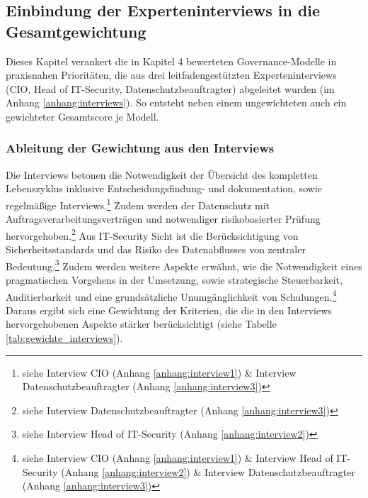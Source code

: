 \subsection{Einbindung der Experteninterviews in die Gesamtgewichtung}
\label{subsec:interviews}
Dieses Kapitel verankert die in Kapitel 4 bewerteten Governance-Modelle in praxisnahen Prioritäten, die aus drei leitfadengestützten Experteninterviews (CIO, Head of IT-Security, Datenschutzbeauftragter) abgeleitet wurden (im Anhang \ref{anhang:interviews}).
So entsteht neben einem ungewichteten auch ein gewichteter Gesamtscore je Modell.

\subsubsection{Ableitung der Gewichtung aus den Interviews}
Die Interviews betonen die Notwendigkeit der Übersicht des kompletten Lebenszyklus inklusive Entscheidungsfindung- und dokumentation, sowie regelmäßige Interviews.\footnote{siehe Interview CIO (Anhang \ref{anhang:interview1}) \& Interview Datenschutzbeauftragter (Anhang \ref{anhang:interview3})}
Zudem werden der Datenschutz mit Auftragsverarbeitungsverträgen und notwendiger risikobasierter Prüfung hervorgehoben.\footnote{siehe Interview Datenschutzbeauftragter (Anhang \ref{anhang:interview3})}
Aus IT-Security Sicht ist die Berücksichtigung von Sicherheitsstandards und das Risiko des Datenabflusses von zentraler Bedeutung.\footnote{siehe Interview Head of IT-Security (Anhang \ref{anhang:interview2})}
Zudem werden weitere Aspekte erwähnt, wie die Notwendigkeit eines pragmatischen Vorgehens in der Umsetzung, sowie strategische Steuerbarkeit, Auditierbarkeit und eine grundsätzliche Unumgänglichkeit von Schulungen.\footnote{siehe Interview CIO (Anhang \ref{anhang:interview1}) \& Interview Head of IT-Security (Anhang \ref{anhang:interview2}) \& Interview Datenschutzbeauftragter (Anhang \ref{anhang:interview3})}
\\
Daraus ergibt sich eine Gewichtung der Kriterien, die die in den Interviews hervorgehobenen Aspekte stärker berücksichtigt (siehe Tabelle \ref{tab:gewichte_interviews}).

